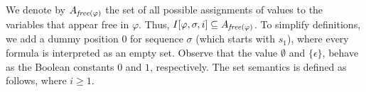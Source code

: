\iffalse
We denote by $A_{\mathit{free} ( \varphi )}$ the set of all possible assignments
of values to the variables that appear free
in $\varphi$. Thus,
$I [ \varphi, \sigma , i] \subseteq A_{\mathit{free} ( \varphi )}$.
To simplify definitions, we add
a dummy position $0$ for sequence $\sigma$ (which starts with $s_1$), 
where every formula is interpreted as an empty set.
Observe that the value $\emptyset$ and $\{ \epsilon \}$, behave
as the Boolean constants $0$ and $1$, respectively.
The set semantics is defined as follows, where $i \ge 1$.

